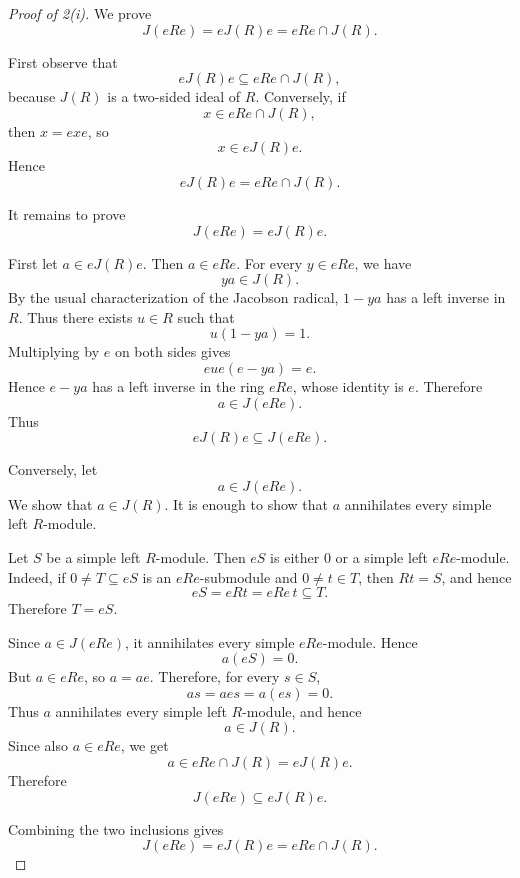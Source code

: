         \begin{proof}[Proof of 2(i)]
        We prove
        \[
            J(eRe)=eJ(R)e=eRe\cap J(R).
        \]
        
        First observe that
        \[
            eJ(R)e\subseteq eRe\cap J(R),
        \]
        because \(J(R)\) is a two-sided ideal of \(R\). Conversely, if
        \[
            x\in eRe\cap J(R),
        \]
        then \(x=exe\), so
        \[
            x\in eJ(R)e.
        \]
        Hence
        \[
            eJ(R)e=eRe\cap J(R).
        \]
        
        It remains to prove
        \[
            J(eRe)=eJ(R)e.
        \]
        
        First let \(a\in eJ(R)e\). Then \(a\in eRe\). For every \(y\in eRe\), we have
        \[
            ya\in J(R).
        \]
        By the usual characterization of the Jacobson radical, \(1-ya\) has a left inverse in
        \(R\). Thus there exists \(u\in R\) such that
        \[
            u(1-ya)=1.
        \]
        Multiplying by \(e\) on both sides gives
        \[
            eue(e-ya)=e.
        \]
        Hence \(e-ya\) has a left inverse in the ring \(eRe\), whose identity is \(e\). Therefore
        \[
            a\in J(eRe).
        \]
        Thus
        \[
            eJ(R)e\subseteq J(eRe).
        \]
        
        Conversely, let
        \[
            a\in J(eRe).
        \]
        We show that \(a\in J(R)\). It is enough to show that \(a\) annihilates every simple
        left \(R\)-module.
        
        Let \(S\) be a simple left \(R\)-module. Then \(eS\) is either \(0\) or a simple
        left \(eRe\)-module. Indeed, if \(0\neq T\subseteq eS\) is an \(eRe\)-submodule and
        \(0\neq t\in T\), then \(Rt=S\), and hence
        \[
            eS=eRt=eRe\,t\subseteq T.
        \]
        Therefore \(T=eS\).
        
        Since \(a\in J(eRe)\), it annihilates every simple \(eRe\)-module. Hence
        \[
            a(eS)=0.
        \]
        But \(a\in eRe\), so \(a=ae\). Therefore, for every \(s\in S\),
        \[
            as=ae s=a(es)=0.
        \]
        Thus \(a\) annihilates every simple left \(R\)-module, and hence
        \[
            a\in J(R).
        \]
        Since also \(a\in eRe\), we get
        \[
            a\in eRe\cap J(R)=eJ(R)e.
        \]
        Therefore
        \[
            J(eRe)\subseteq eJ(R)e.
        \]
        
        Combining the two inclusions gives
        \[
            J(eRe)=eJ(R)e=eRe\cap J(R).
        \]
        \end{proof}
        
